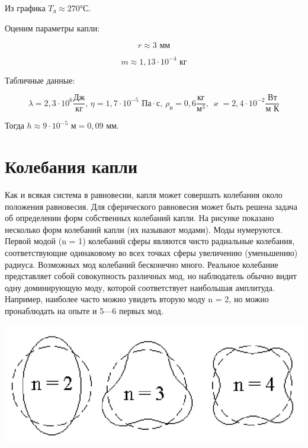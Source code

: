 \documentclass[a4paper,12pt]{article} %
\begin{document}
\noindent Из графика $T_{\text{л}} \approx 270$°С.

\medskip

\noindent Оценим параметры капли:

$$ r \approx 3 \text{ мм}$$

$$ m \approx 1,13 \cdot 10^{-4} \text{ кг}$$

\noindent Табличные данные:

$$ \lambda = 2,3 \cdot 10^6 \frac{\text{Дж}}{\text{кг}}\text{, } \eta = 1,7 \cdot 10^{-5} \text{ Па} \cdot \text{с}\text{, } \rho_{\text{п}} = 0,6 \frac{\text{кг}}{\text{м}^3}\text{, } \varkappa = 2,4 \cdot 10^{-2} \frac{\text{Вт}}{\text{м К}} $$

\noindent Тогда $h \approx 9 \cdot 10^{-5} \text{ м} = 0,09 \text{ мм}$.


\medskip

\section{Колебания капли}

\noindent Как и всякая система в равновесии, капля может совершать колебания около положения равновесия. Для сферического равновесия может быть решена задача об определении форм собственных колебаний капли. На рисунке показано несколько форм колебаний капли (их называют модами). Моды нумеруются. Первой модой (n = 1) колебаний сферы являются чисто радиальные колебания, соответствующие одинаковому во всех точках сферы увеличению (уменьшению) радиуса. Возможных мод колебаний бесконечно много. Реальное колебание представляет собой совокупность различных мод, но наблюдатель обычно видит одну доминирующую моду, которой соответствует наибольшая амплитуда. Например, наиболее часто можно увидеть вторую моду n = 2, но можно пронаблюдать на опыте и 5—6 первых мод. 
\medskip



\begin{center}
  \includegraphics[scale={0.7}]{моды.jpg}
\end{center}
\end{document}
